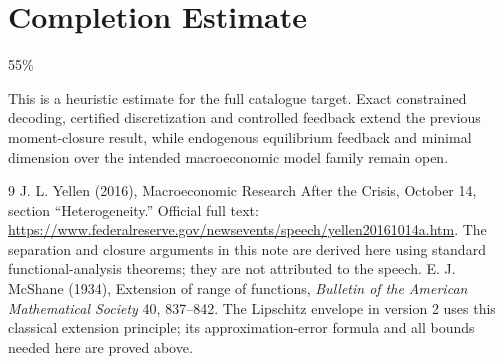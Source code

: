 \documentclass[11pt]{article}
\theoremstyle{definition}
\begin{document}
\section{Completion Estimate}
55\%

This is a heuristic estimate for the full catalogue target. Exact constrained
decoding, certified discretization and controlled feedback extend the
previous moment-closure result, while endogenous equilibrium feedback and
minimal dimension over the intended macroeconomic model family remain open.

\begin{thebibliography}{9}
 J. L. Yellen (2016), Macroeconomic Research After the Crisis, October 14, section ``Heterogeneity.'' Official full text: \url{https://www.federalreserve.gov/newsevents/speech/yellen20161014a.htm}. The separation and closure arguments in this note are derived here using standard functional-analysis theorems; they are not attributed to the speech.
 E. J. McShane (1934), Extension of range of functions,
\emph{Bulletin of the American Mathematical Society} 40, 837--842.
The Lipschitz envelope in version 2 uses this classical extension principle;
its approximation-error formula and all bounds needed here are proved above.
\end{thebibliography}
\end{document}
